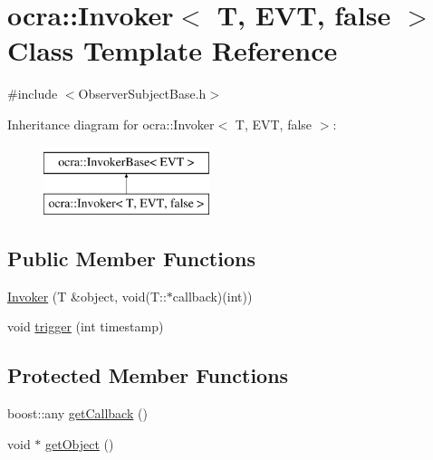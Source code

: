 \hypertarget{classocra_1_1Invoker_3_01T_00_01EVT_00_01false_01_4}{}\section{ocra\+:\+:Invoker$<$ T, E\+VT, false $>$ Class Template Reference}
\label{classocra_1_1Invoker_3_01T_00_01EVT_00_01false_01_4}


{\ttfamily \#include $<$Observer\+Subject\+Base.\+h$>$}

Inheritance diagram for ocra\+:\+:Invoker$<$ T, E\+VT, false $>$\+:\begin{figure}[H]
\begin{center}
\leavevmode
\includegraphics[height=2.000000cm]{d6/d77/classocra_1_1Invoker_3_01T_00_01EVT_00_01false_01_4}
\end{center}
\end{figure}
\subsection*{Public Member Functions}
\begin{DoxyCompactItemize}
\item 
\hyperlink{classocra_1_1Invoker_3_01T_00_01EVT_00_01false_01_4_a913ba3411bdcdb4fa509673eb91de808}{Invoker} (T \&object, void(T\+::$\ast$callback)(int))
\item 
void \hyperlink{classocra_1_1Invoker_3_01T_00_01EVT_00_01false_01_4_a740261f9f9c3278c9668d192eae56c2a}{trigger} (int timestamp)
\end{DoxyCompactItemize}
\subsection*{Protected Member Functions}
\begin{DoxyCompactItemize}
\item 
boost\+::any \hyperlink{classocra_1_1Invoker_3_01T_00_01EVT_00_01false_01_4_a459bd95f3eae2d06b9167fd98c1c7e22}{get\+Callback} ()
\item 
void $\ast$ \hyperlink{classocra_1_1Invoker_3_01T_00_01EVT_00_01false_01_4_ad77a4342ddfd1b1e1387065276c54246}{get\+Object} ()
\end{DoxyCompactItemize}
